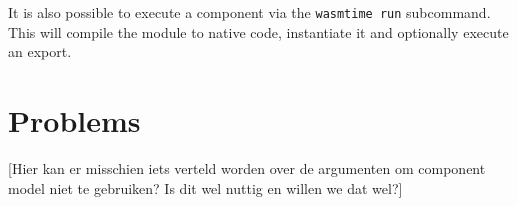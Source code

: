 It is also possible to execute a component via the \texttt{wasmtime run} subcommand. This will compile the module to native code, instantiate it and optionally execute an export.


\section{Problems}

[Hier kan er misschien iets verteld worden over de argumenten om component model niet te gebruiken? Is dit wel nuttig en willen we dat wel?]
